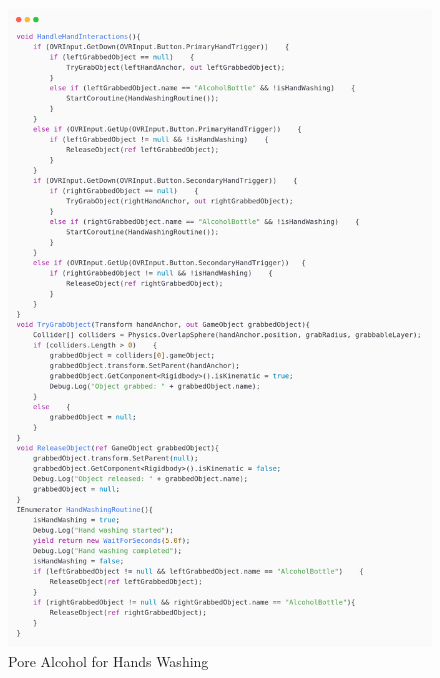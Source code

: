 \newpage
\begin{figure}[h]
	\centering
	\includegraphics[width=1\textwidth, height=0.7\textheight]{Images/pore alcohol1.png}
	\caption{Pore Alcohol for Hands Washing}
	\label{fig:Grabbing-Tool}
\end{figure}
\newpage
